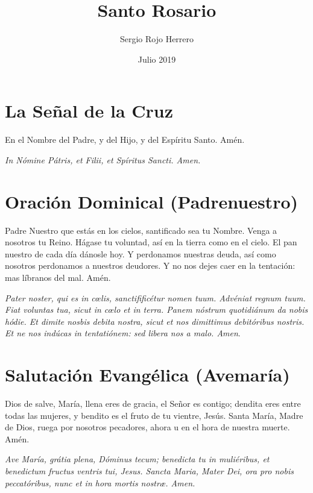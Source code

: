 \documentclass[a4paper,11pt, oneside]{report}
\title{Santo Rosario}
\author{Sergio Rojo Herrero}
\date{Julio 2019}
\begin{document}
  
  \begin{titlepage}
    \maketitle    
  \end{titlepage}

  \section*{La Señal de la Cruz}
    En el Nombre del Padre, y del Hijo, y del Espíritu Santo. Amén.

    \medskip

    \textit{In Nómine Pátris, et Filii, et Spíritus Sancti. Amen.}

  \section*{Oración Dominical (Padrenuestro)}
    
    Padre Nuestro que estás en los cielos, santificado sea tu Nombre. Venga a nosotros tu Reino. Hágase tu voluntad, así en la tierra como
    en el cielo. El pan nuestro de cada día dánosle hoy. Y perdonamos nuestras deuda, así como nosotros perdonamos a nuestros deudores.
    Y no nos dejes caer en la tentación: mas líbranos del mal. Amén.
    
    \medskip

    \textit{Pater noster, qui es in c{\oe}lis, sanctifificétur nomen tuum. Advéniat regnum tuum. Fiat voluntas tua, sicut in c{\oe}lo et in terra.
    Panem nóstrum quotidiánum da nobis hódie. Et dimite nosbis debita nostra, sicut et nos dimittimus debitóribus nostris. Et ne nos indúcas
    in tentatiónem: sed libera nos a malo. Amen}.

  \section*{Salutación Evangélica (Avemaría)}
    Dios de salve, María, llena eres de gracia, el Señor es contigo; dendita eres entre todas las mujeres, y bendito es el fruto de tu
    vientre, Jesús. Santa María, Madre de Dios, ruega por nosotros pecadores, ahora u en el hora de nuestra muerte. Amén.
    
    \medskip

    \textit{Ave María, grátia plena, Dóminus tecum; benedicta tu in muliéribus, et benedictum fructus ventris tui, Jesus.
    Sancta Maria, Mater Dei, ora pro nobis peccatóribus, nunc et in hora mortis nostr{\ae}. Amen.}
\end{document}

